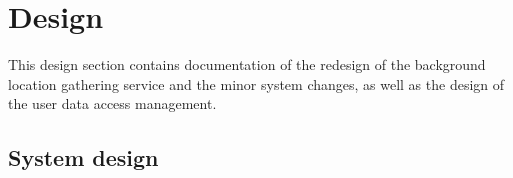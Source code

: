 \section{Design}
This design section contains documentation of the redesign of the background location gathering service and the minor system changes, as well as the design of the user data access management.

\subsection{System design}





